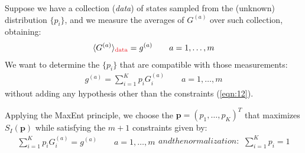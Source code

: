 \documentclass[../../main.tex]{subfiles}
\begin{document}
\medskip

Suppose we have a collection (\textit{data}) of states sampled from the (unknown) distribution $\{p_i\}$, and we measure the averages of $G^{(a)}$ over such collection, obtaining:
\begin{align}\label{eqn:11}
    \langle G^{(a)} \rangle_{\textcolor{Red}{\rm{data}}} = g^{(a)} \qquad a=1,\dots,m
\end{align}
We want to determine the $\{p_i\}$ that are compatible with those measurements:
\begin{align}\label{eqn:12}
    g^{(a)} = \sum_{i=1}^K p_i G_i^{(a)} \qquad a=1,\dots,m
\end{align}
without adding any  hypothesis other than the constraints (\ref{eqn:12}).

\medskip

Applying the MaxEnt principle, we choose the $\bm{p} = (p_1, \dots, p_K)^T$ that maximizes $S_I(\bm{p})$ while satisfying the $m+1$ constraints given by:
\begin{subequations}
\begin{align}\label{eqn:13a}
    \sum_{i=1}^K p_i G_i^{(a)} = g^{(a)} \qquad a=1,\dots,m
\end{align} 
and the normalization:
\begin{align}
    \sum_{i=1}^K p_i = 1
    \label{eqn:13b}
\end{align}
\end{subequations}
\end{document}
